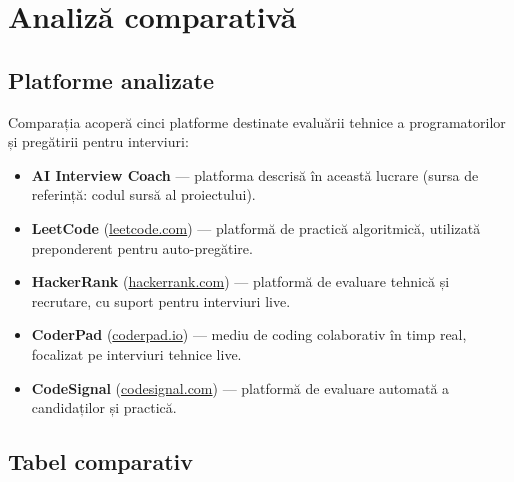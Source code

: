 %
%

\section{Analiză comparativă}
\label{sec:analiza_comparativa}

\subsection{Platforme analizate}

Comparația acoperă cinci platforme destinate evaluării tehnice a
programatorilor și pregătirii pentru interviuri:

\begin{itemize}
  \item \textbf{AI Interview Coach} — platforma descrisă în această
        lucrare (sursa de referință: codul sursă al proiectului).
  \item \textbf{LeetCode} (\url{leetcode.com}) — platformă de practică
        algoritmică, utilizată preponderent pentru auto-pregătire.
  \item \textbf{HackerRank} (\url{hackerrank.com}) — platformă de
        evaluare tehnică și recrutare, cu suport pentru interviuri live.
  \item \textbf{CoderPad} (\url{coderpad.io}) — mediu de coding
        colaborativ în timp real, focalizat pe interviuri tehnice live.
  \item \textbf{CodeSignal} (\url{codesignal.com}) — platformă de
        evaluare automată a candidaților și practică.
\end{itemize}

\subsection{Tabel comparativ}

\begingroup
\small
\setlength{\tabcolsep}{4pt}
\renewcommand{\arraystretch}{1.35}

